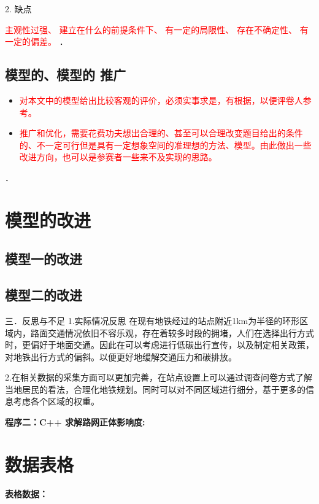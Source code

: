 \documentclass[12pt,a4paper]{mcmthesis}
\begin{document}
    2. 缺点

    \textcolor{red}{主观性过强、
    建立在什么的前提条件下、
    有一定的局限性、
    存在不确定性、
    有一定的偏差。
    }
    ．

    \subsection{模型的、模型的 推广}

    \begin{itemize}

        \item \textcolor{red}{对本文中的模型给出比较客观的评价，必须实事求是，有根据，以便评卷人参考。}

        \item \textcolor{red}{推广和优化，需要花费功夫想出合理的、甚至可以合理改变题目给出的条件的、不一定可行但是具有一定想象空间的准理想的方法、模型。由此做出一些改进方向，也可以是参赛者一些来不及实现的思路。}
    \end{itemize}

    ．


    \section{模型的改进}

    \subsection{模型一的改进}

    \subsection{模型二的改进}
    三．反思与不足
    1.实际情况反思
    在现有地铁经过的站点附近1km为半径的环形区域内，路面交通情况依旧不容乐观，存在着较多时段的拥堵，人们在选择出行方式时，更偏好于地面交通。因此在可以考虑进行低碳出行宣传，以及制定相关政策，对地铁出行方式的偏斜。以便更好地缓解交通压力和碳排放。

    2.在相关数据的采集方面可以更加完善，在站点设置上可以通过调查问卷方式了解当地居民的看法，合理化地铁规划。同时可以对不同区域进行细分，基于更多的信息考虑各个区域的权重。

    \textcolor[rgb]{0.98,0.00,0.00}{\textbf{程序二：C++ 求解路网正体影响度:}}
    

    \newpage
    \setcounter{table}{0}
    \section*{数据表格}
    \textcolor[rgb]{0.98,0.00,0.00}{\textbf{表格数据：}}
    
\end{document}

